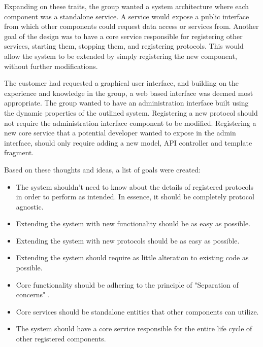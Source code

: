 Expanding on these traits, the group wanted a system architecture where each component was a standalone service. A service would expose a public interface from which other components could request data access or services from. Another goal of the design was to have a core service responsible for registering other services, starting them, stopping them, and registering protocols. This would allow the system to be extended by simply registering the new component, without further modifications.

The customer had requested a graphical user interface, and building on the experience and knowledge in the group, a web based interface was deemed most appropriate. The group wanted to have an administration interface built using the dynamic properties of the outlined system. Registering a new protocol should not require the administration interface component to be modified. Registering a new core service that a potential developer wanted to expose in the admin interface, should only require adding a new model, API controller and template fragment.

Based on these thoughts and ideas, a list of goals were created:

\begin{itemize}
\item The system shouldn't need to know about the details of registered protocols in order to perform as intended. In essence, it should be completely protocol agnostic.
\item Extending the system with new functionality should be as easy as possible.
\item Extending the system with new protocols should be as easy as possible.
\item Extending the system should require as little alteration to existing code as possible.
\item Core functionality should be adhering to the principle of "Separation of concerns" \cite{soc}.
\item Core services should be standalone entities that other components can utilize.
\item The system should have a core service responsible for the entire life cycle of other registered components.
\end{itemize}

